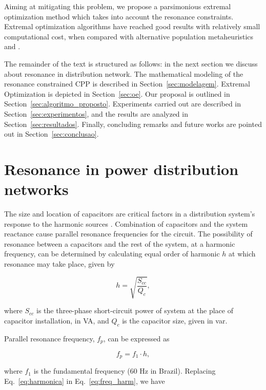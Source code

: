 \documentclass[11pt]{article}
\begin{document}
Aiming at mitigating this problem, we propose a parsimonious extremal optimization method 
which takes into account the resonance constraints. Extremal optimization algorithms have
reached good results with relatively small computational cost, when compared with alternative
population metaheuristics \citep{Lu2009} and \citep{Lu2007}.

The remainder of the text is structured as follows: in the next section we discuss about
resonance in distribution network. The mathematical modeling of the resonance constrained
CPP is described in Section~\ref{sec:modelagem}. Extremal Optimization is depicted in 
Section~\ref{sec:oe}. Our proposal is outlined in Section~\ref{sec:algoritmo_proposto}. 
Experiments carried out are described in Section~\ref{sec:experimentos}, and the results are analyzed in 
Section~\ref{sec:resultados}. Finally, concluding remarks and future works are pointed out
in Section~\ref{sec:conclusao}. 

\section{Resonance in power distribution networks}
\label{sec:ressonancia}

The size and location of capacitors are critical factors in a distribution system's
response to the harmonic sources \citep{Gonen1986}. Combination of capacitors and
the system reactance cause parallel resonance frequencies 
for the circuit. The possibility of resonance between a capacitors and the 
rest of the system, at a harmonic frequency, can be determined by calculating 
equal order of harmonic $h$ at which resonance may take place, given by \citep{Gonen1986}

\begin{equation}
	h = \sqrt{\frac{S_{cc}}{Q_c}},
\label{eq:harmonica}
\end{equation}

\noindent where $S_{cc}$ is the three-phase short-circuit power of system at 
the place of capacitor installation, in VA, and $Q_c$ is the capacitor size, given in var.

Parallel resonance frequency, $f_p$, can be expressed as

\begin{equation}
	f_p = f_1\cdot h,	
\label{eq:freq_harm}
\end{equation}

\noindent where $f_1$ is the fundamental frequency (60 Hz in Brazil). Replacing  Eq.~\ref{eq:harmonica}
in Eq.~\ref{eq:freq_harm}, we have
\end{document}
